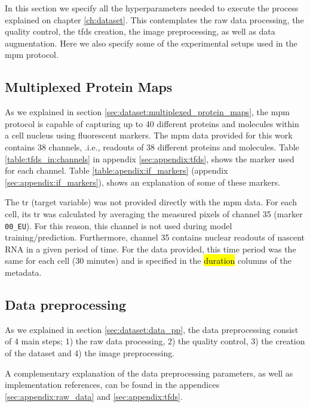 
\glsresetall
\graphicspath{{./Sections/Methodology/Resources/}}

In this section we specify all the hyperparameters needed to execute the process explained on chapter \ref{ch:dataset}. This contemplates the raw data processing, the quality control, the \gls{tfds} creation, the image preprocessing, as well as data augmentation. Here we also specify some of the experimental setups used in the \gls{mpm} protocol.

\subsection{Multiplexed Protein Maps}

As we explained in section \ref{sec:dataset:multiplexed_protein_maps}, the \gls{mpm} protocol is capable of capturing up to 40 different proteins and molecules within a cell nucleus using fluorescent markers. The \gls{mpm} data provided for this work contains 38 channels, .i.e., readouts of 38 different proteins and molecules. Table \ref{table:tfds_in:channels} in appendix \ref{sec:appendix:tfds}, shows the marker used for each channel. Table \ref{table:apendix:if_markers} (appendix \ref{sec:appendix:if_markers}), shows an explanation of some of these markers.

The \gls{tr} (target variable) was not provided directly with the \gls{mpm} data. For each cell, its \gls{tr} was calculated by averaging the measured pixels of channel 35 (marker \texttt{00\_EU}). For this reason, this channel is not used during model training/prediction. Furthermore, channel 35 contains nuclear readouts of nascent RNA in a given period of time. For the data provided, this time period was the same for each cell (30 minutes) and is specified in the \hl{duration} columns of the metadata.

\subsection{Data preprocessing}

As we explained in section \ref{sec:dataset:data_pp}, the data preprocessing consist of 4 main steps; 1) the raw data processing, 2) the quality control, 3) the creation of the dataset and 4) the image preprocessing.

A complementary explanation of the data preprocessing parameters, as well as implementation references, can be found in the appendices \ref{sec:appendix:raw_data} and \ref{sec:appendix:tfds}.


